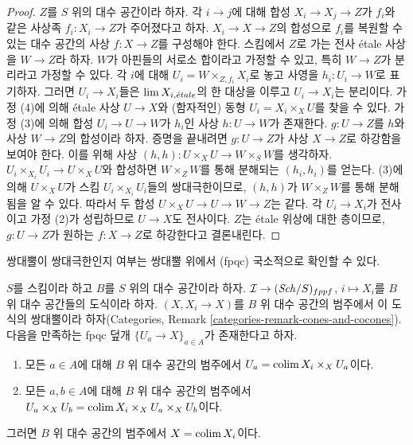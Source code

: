 \begin{proof}
$Z$를 $S$ 위의 대수 공간이라 하자. 각 $i \to j$에 대해
합성 $X_i \to X_j \to Z$가 $f_i$와 같은
사상족 $f_i : X_i \to Z$가 주어졌다고 하자.
$X_i \to X \to Z$의 합성으로 $f_i$를 복원할 수 있는
대수 공간의 사상 $f : X \to Z$를 구성해야 한다.
스킴에서 $Z$로 가는 전사 \'etale 사상을 $W \to Z$라 하자.
$W$가 아핀들의 서로소 합이라고 가정할 수 있고, 특히
$W \to Z$가 분리라고 가정할 수 있다.
각 $i$에 대해 $U_i = W \times_{Z, f_i} X_i$로 놓고
사영을 $h_i : U_i \to W$로 표기하자.
그러면 $U_i \to X_i$들은 $\mathop{\mathrm{lim}}\nolimits X_{i, {\acute{e}tale}}$의 한 대상을 이루고
$U_i \to X_i$는 분리이다. 가정 (4)에 의해 \'etale 사상
$U \to X$와 (함자적인) 동형 $U_i = X_i \times_X U$를 찾을 수 있다.
가정 (3)에 의해 합성 $U_i \to U \to W$가 $h_i$인 사상
$h : U \to W$가 존재한다. $g : U \to Z$를 $h$와
사상 $W \to Z$의 합성이라 하자. 증명을 끝내려면
$g : U \to Z$가 사상 $X \to Z$로 하강함을 보여야 한다.
이를 위해 사상
$(h, h) : U \times_X U \to W \times_S W$를 생각하자.
$U_i \times_{X_i} U_i \to U \times_X U$와 합성하면
$W \times_Z W$를 통해 분해되는 $(h_i, h_i)$를 얻는다.
(3)에 의해 $U \times_X U$가 스킴 $U_i \times_{X_i} U_i$들의
쌍대극한이므로, $(h, h)$가 $W \times_Z W$를 통해 분해됨을 알 수 있다.
따라서 두 합성 $U \times_X U \to U \to W \to Z$는 같다.
각 $U_i \to X_i$가 전사이고 가정 (2)가 성립하므로
$U \to X$도 전사이다. $Z$는 \'etale 위상에 대한 층이므로,
$g : U \to Z$가 원하는 $f : X \to Z$로 하강한다고 결론내린다.
\end{proof}





\noindent
쌍대뿔이 쌍대극한인지 여부는 쌍대뿔 위에서 (fpqc) 국소적으로
확인할 수 있다.

\begin{lemma}
\label{lemma-pushout-fpqc-local}
$S$를 스킴이라 하고 $B$를 $S$ 위의 대수 공간이라 하자.
$\mathcal{I} \to (\mathit{Sch}/S)_{fppf}$, $i \mapsto X_i$를
$B$ 위 대수 공간들의 도식이라 하자.
$(X, X_i \to X)$를 $B$ 위 대수 공간의 범주에서 이 도식의
쌍대뿔이라 하자(Categories, Remark
\ref{categories-remark-cones-and-cocones}).
다음을 만족하는 fpqc 덮개 $\{U_a \to X\}_{a \in A}$가 존재한다고 하자.
\begin{enumerate}
\item 모든 $a \in A$에 대해 $B$ 위 대수 공간의 범주에서
$U_a = \mathop{\mathrm{colim}}\nolimits X_i \times_X U_a$이다.
\item 모든 $a, b \in A$에 대해 $B$ 위 대수 공간의 범주에서
$U_a \times_X U_b = \mathop{\mathrm{colim}}\nolimits X_i \times_X U_a \times_X U_b$이다.
\end{enumerate}
그러면 $B$ 위 대수 공간의 범주에서 $X = \mathop{\mathrm{colim}}\nolimits X_i$이다.
\end{lemma}

